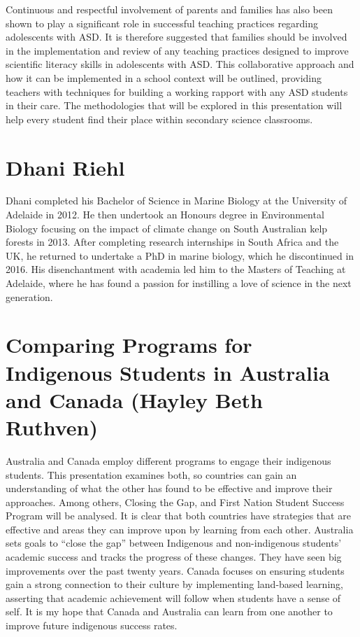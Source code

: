 \documentclass[twoside,14pt,a4paper,notitlepage]{memoir}
\begin{document}
Continuous and respectful involvement of parents and families has also been shown to play a significant role in successful teaching practices regarding adolescents with ASD. It is therefore suggested that families should be involved in the implementation and review of any teaching practices designed to improve scientific literacy skills in adolescents with ASD. This collaborative approach and how it can be implemented in a school context will be outlined, providing teachers with techniques for building a working rapport with any ASD students in their care. The methodologies that will be explored in this presentation will help every student find their place within secondary science classrooms.

\section*{Dhani Riehl}

Dhani completed his Bachelor of Science in Marine Biology at the University of Adelaide in 2012. He then undertook an Honours degree in Environmental Biology focusing on the impact of climate change on South Australian kelp forests in 2013. After completing research internships in South Africa and the UK, he returned to undertake a PhD in marine biology, which he discontinued in 2016. His disenchantment with academia led him to the Masters of Teaching at Adelaide, where he has found a passion for instilling a love of science in the next generation.



\section*{Comparing Programs for Indigenous Students in Australia and Canada (Hayley Beth Ruthven)}
\label{aut:ruthven}

Australia and Canada employ different programs to engage their indigenous students. This presentation examines both, so countries can gain an understanding of what the other has found to be effective and improve their approaches. 
Among others, Closing the Gap, and First Nation Student Success Program will be analysed. It is clear that both countries have strategies that are effective and areas they can improve upon by learning from each other. Australia sets goals to “close the gap” between Indigenous and non-indigenous students’ academic success and tracks the progress of these changes. They have seen big improvements over the past twenty years. Canada focuses on ensuring students gain a strong connection to their culture by implementing land-based learning, asserting that academic achievement will follow when students have a sense of self. 
It is my hope that Canada and Australia can learn from one another to improve future indigenous success rates. 
\end{document}
